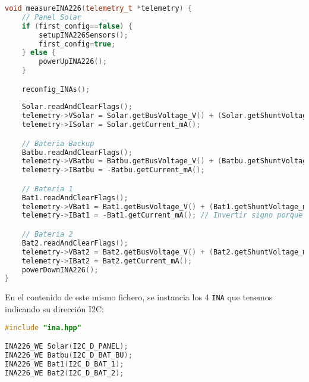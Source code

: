 \begin{itemize}
\begin{lstlisting}[captionpos=b, caption={Codigo funcion measureINA226}, language=c++]
void measureINA226(telemetry_t *telemetry) {
    // Panel Solar
    if (first_config==false) {
        setupINA226Sensors();
        first_config=true;
    } else {
        powerUpINA226();  
    }

    reconfig_INAs();
    
    Solar.readAndClearFlags();
    telemetry->VSolar = Solar.getBusVoltage_V() + (Solar.getShuntVoltage_mV() / 100);
    telemetry->ISolar = Solar.getCurrent_mA();

    // Bateria Backup
    Batbu.readAndClearFlags();
    telemetry->VBatbu = Batbu.getBusVoltage_V() + (Batbu.getShuntVoltage_mV() / 100);
    telemetry->IBatbu = -Batbu.getCurrent_mA();

    // Bateria 1
    Bat1.readAndClearFlags();
    telemetry->VBat1 = Bat1.getBusVoltage_V() + (Bat1.getShuntVoltage_mV() / 100);
    telemetry->IBat1 = -Bat1.getCurrent_mA(); // Invertir signo porque esta al reves

    // Bateria 2
    Bat2.readAndClearFlags();
    telemetry->VBat2 = Bat2.getBusVoltage_V() + (Bat2.getShuntVoltage_mV() / 100);
    telemetry->IBat2 = Bat2.getCurrent_mA();
    powerDownINA226();
}
\end{lstlisting}

En el contenido de este mismo fichero, se instancia los 4 \texttt{INA} que tenemos indicando su dirección I2C:

\begin{lstlisting}[captionpos=b, caption={Instancia de las direcciones de los \texttt{INA}.}, language=c++]
#include "ina.hpp"

INA226_WE Solar(I2C_D_PANEL);
INA226_WE Batbu(I2C_D_BAT_BU);
INA226_WE Bat1(I2C_D_BAT_1);
INA226_WE Bat2(I2C_D_BAT_2);
\end{lstlisting}

\end{itemize}
